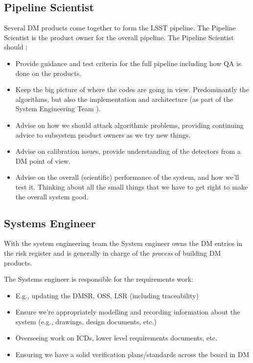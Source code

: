\subsection{Pipeline Scientist \label{role:pipe}}
Several DM products come together to form the LSST pipeline. The Pipeline Scientist is the product owner for the overall pipeline. 
The Pipeline Scientist should :
\begin{itemize}
\item  Provide guidance and test criteria for the full pipeline including how QA is done on the products.  
\item Keep the big picture of where the codes are going in view. Predominantly the algorithms, but also the implementation and architecture (as part of the System Engineering Team ).


\item Advise on how we should attack algorithmic problems,  
providing continuing advice to subsystem product owners as we try new things. 

\item Advise on calibration issues, provide understanding of the detectors from a DM point of view. 

\item Advise on the overall (scientific) performance of the system, and how we'll test it.  Thinking about all the small things that we have to get right to make the overall system good.



\end{itemize}


\subsection{Systems Engineer \label{role:sysengineer}}
With the system engineering team  
 the System engineer 
 owns the DM entries in the risk register and is generally in charge of the {\em process} of building DM products. 

The Systems engineer  is responsible for the requirements work:
\begin{itemize}
\item E.g., updating the DMSR, OSS, LSR (including traceability)
\item Ensure we’re appropriately modelling and recording information about the system (e.g.,
    drawings, design documents, etc.)
\item Overseeing work on ICDs, lower level requirements documents, etc.
\item Ensuring we have a solid verification plans/standards across the board in DM
\end{itemize}

